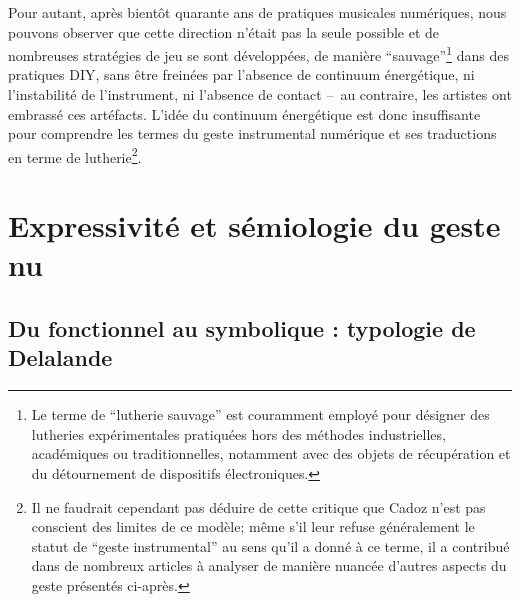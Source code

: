 \indent Pour autant, après bientôt quarante ans de pratiques musicales numériques, nous pouvons observer que cette direction n'était pas la seule possible et de nombreuses stratégies de jeu se sont développées, de manière ``sauvage''\footnote{Le terme de ``lutherie sauvage'' est couramment employé pour désigner des lutheries expérimentales pratiquées hors des méthodes industrielles, académiques ou traditionnelles, notamment avec des objets de récupération et du détournement de dispositifs électroniques.} dans des pratiques \gls{DIY}, sans être freinées par l'absence de continuum énergétique, ni l'instabilité de l'instrument, ni l'absence de contact --~au contraire, les artistes ont embrassé ces artéfacts. L'idée du continuum énergétique est donc insuffisante pour comprendre les termes du geste instrumental numérique et ses traductions en terme de lutherie\footnote{Il ne faudrait cependant pas déduire de cette critique que Cadoz n'est pas conscient des limites de ce modèle; même s'il leur refuse généralement le statut de ``geste instrumental'' au sens qu'il a donné à ce terme, il a contribué dans de nombreux articles à analyser de manière nuancée d'autres aspects du geste présentés ci-après.}.


\section{Expressivité et sémiologie du geste nu}

\subsection{Du fonctionnel au symbolique : typologie de Delalande}

